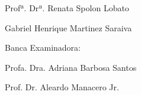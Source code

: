 \documentclass[
	12pt,
	openright,
	oneside,
	a4paper,
	english,
	brazil
	]{abntex2}
\begin{document}
\frenchspacing 


\imprimircapa

\imprimirfolhaderosto


\begin{folhadeaprovacao}

  \begin{center}
    {\ABNTEXchapterfont\large\imprimirautor}

    \vspace*{\fill}\vspace*{\fill}
    \begin{center}
      \ABNTEXchapterfont\bfseries\Large\imprimirtitulo
    \end{center}
    \vspace*{\fill}
    
    \hspace{.45\textwidth}
    \begin{minipage}{.5\textwidth}
        \imprimirpreambulo
    \end{minipage}%
    \vspace*{\fill}
   \end{center}
        
   \par
    \vspace{85pt}
    \hspace*{1pt}\parbox{7.6cm}{{\large Profª. Drª. Renata Spolon Lobato}}
    \hspace*{3pt}\parbox{7.6cm}{{\large Gabriel Henrique Martinez Saraiva}}

    \par
    \vspace{40pt}
    \hspace*{160pt}\parbox{7.6cm}{{ Banca Examinadora:}}

    \par
    \vspace{1em}
    \hspace*{160pt}\parbox{7.6cm}{{\large Profa. Dra. Adriana Barbosa Santos}}
    

    \par
    \vspace{5pt}
    \hspace*{160pt}\parbox{7.6cm}{{\large Prof. Dr. Aleardo Manacero Jr.}}
      
   \begin{center}
    \vspace*{0.5cm}
    {\large\imprimirlocal}
    \par
    {\large\imprimirdata}
    \vspace*{1cm}
  \end{center}
  
\end{folhadeaprovacao}
\end{document}
